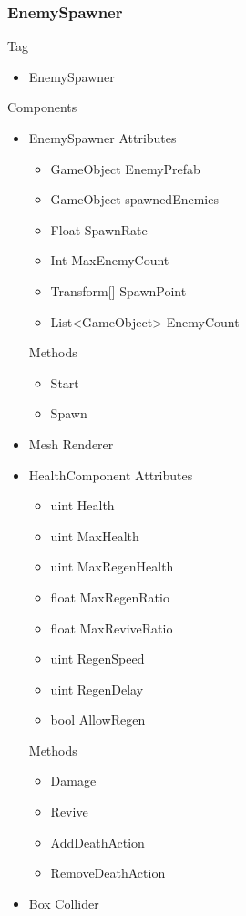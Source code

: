 \documentclass[11pt]{article}
\begin{document}
\subsubsection{EnemySpawner}
Tag
\begin{itemize}
	\item EnemySpawner
\end{itemize}
Components
\begin{itemize}
	\item EnemySpawner
	\newline Attributes
	\begin{itemize}
		\item GameObject EnemyPrefab
		\item GameObject spawnedEnemies
		\item Float SpawnRate
		\item Int MaxEnemyCount
		\item Transform[] SpawnPoint
		\item List<GameObject> EnemyCount
	\end{itemize}
	Methods
	\begin{itemize}
		\item Start
		\item Spawn
	\end{itemize}
	\item Mesh Renderer
	\item HealthComponent
	\newline Attributes
	\begin{itemize}
		\item uint Health
		\item uint MaxHealth
		\item uint MaxRegenHealth
		\item float MaxRegenRatio
		\item float MaxReviveRatio
		\item uint RegenSpeed
		\item uint RegenDelay
		\item bool AllowRegen
	\end{itemize}
	Methods
	\begin{itemize}
		\item Damage
		\item Revive
		\item AddDeathAction
		\item RemoveDeathAction
	\end{itemize}
	\item Box Collider
\end{itemize}
\end{document}
